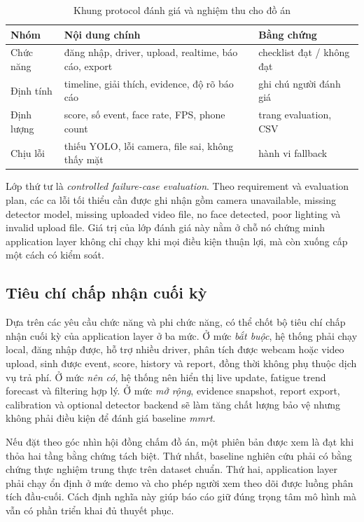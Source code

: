 \documentclass[conference,a4paper]{IEEEtran}
\begin{document}
\begin{table}[t]
\caption{Khung protocol đánh giá và nghiệm thu cho đồ án}
\label{tab:evaluation-protocol}
\centering
\small
\begin{tabular}{p{1.85cm}p{2.45cm}p{2.0cm}}
\toprule
Nhóm & Nội dung chính & Bằng chứng \\
\midrule
Chức năng & đăng nhập, driver, upload, realtime, báo cáo, export & checklist đạt / không đạt \\
Định tính & timeline, giải thích, evidence, độ rõ báo cáo & ghi chú người đánh giá \\
Định lượng & score, số event, face rate, FPS, phone count & trang evaluation, CSV \\
Chịu lỗi & thiếu YOLO, lỗi camera, file sai, không thấy mặt & hành vi fallback \\
\bottomrule
\end{tabular}
\end{table}

Lớp thứ tư là \textit{controlled failure-case evaluation}. Theo requirement và evaluation plan, các ca lỗi tối thiểu cần được ghi nhận gồm camera unavailable, missing detector model, missing uploaded video file, no face detected, poor lighting và invalid upload file. Giá trị của lớp đánh giá này nằm ở chỗ nó chứng minh application layer không chỉ chạy khi mọi điều kiện thuận lợi, mà còn xuống cấp một cách có kiểm soát.

\subsection{Tiêu chí chấp nhận cuối kỳ}
Dựa trên các yêu cầu chức năng và phi chức năng, có thể chốt bộ tiêu chí chấp nhận cuối kỳ của application layer ở ba mức. Ở mức \textit{bắt buộc}, hệ thống phải chạy local, đăng nhập được, hỗ trợ nhiều driver, phân tích được webcam hoặc video upload, sinh được event, score, history và report, đồng thời không phụ thuộc dịch vụ trả phí. Ở mức \textit{nên có}, hệ thống nên hiển thị live update, fatigue trend forecast và filtering hợp lý. Ở mức \textit{mở rộng}, evidence snapshot, report export, calibration và optional detector backend sẽ làm tăng chất lượng bảo vệ nhưng không phải điều kiện để đánh giá baseline \textit{mmrt}.

Nếu đặt theo góc nhìn hội đồng chấm đồ án, một phiên bản được xem là đạt khi thỏa hai tầng bằng chứng tách biệt. Thứ nhất, baseline nghiên cứu phải có bằng chứng thực nghiệm trung thực trên dataset chuẩn. Thứ hai, application layer phải chạy ổn định ở mức demo và cho phép người xem theo dõi được luồng phân tích đầu-cuối. Cách định nghĩa này giúp báo cáo giữ đúng trọng tâm mô hình mà vẫn có phần triển khai đủ thuyết phục.
\end{document}
